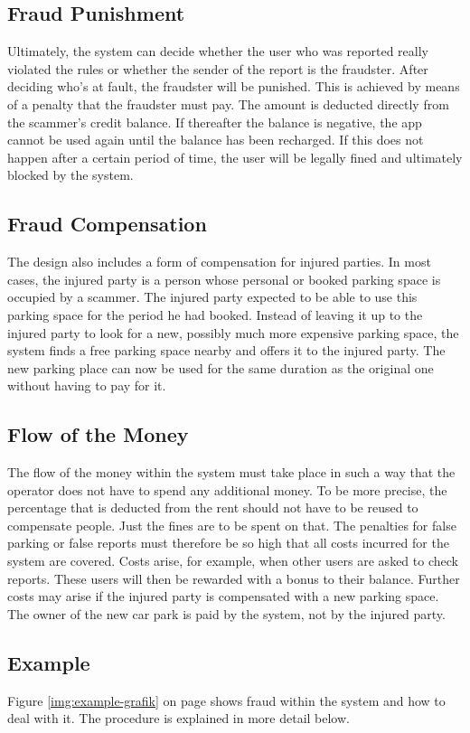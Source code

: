 \documentclass[
a4paper,     %
titlepage,   %
14pt         %
]{scrartcl}  %
\theoremstyle{mystyle}
\begin{document}
\subsection{Fraud Punishment}
Ultimately, the system can decide whether the user who was reported really violated the rules or whether the sender of the report is the fraudster. After deciding who's at fault, the fraudster will be punished. This is achieved by means of a penalty that the fraudster must pay. The amount is deducted directly from the scammer's credit balance. If thereafter the balance is negative, the app cannot be used again until the balance has been recharged. If this does not happen after a certain period of time, the user will be legally fined and ultimately blocked by the system.

\subsection{Fraud Compensation}
The design also includes a form of compensation for injured parties. In most cases, the injured party is a person whose personal or booked parking space is occupied by a scammer. The injured party expected to be able to use this parking space for the period he had booked. Instead of leaving it up to the injured party to look for a new, possibly much more expensive parking space, the system finds a free parking space nearby and offers it to the injured party. The new parking place can now be used for the same duration as the original one without having to pay for it.

\subsection{Flow of the Money}
The flow of the money within the system must take place in such a way that the operator does not have to spend any additional money. To be more precise, the percentage that is deducted from the rent should not have to be reused to compensate people. Just the fines are to be spent on that. The penalties for false parking or false reports must therefore be so high that all costs incurred for the system are covered. Costs arise, for example, when other users are asked to check reports. These users will then be rewarded with a bonus to their balance. Further costs may arise if the injured party is compensated with a new parking space. The owner of the new car park is paid by the system, not by the injured party.

\subsection{Example}
Figure \ref{img:example-grafik} on page \pageref{img:example-grafik} shows fraud within the system and how to deal with it. The procedure is explained in more detail below.\\
\end{document}
